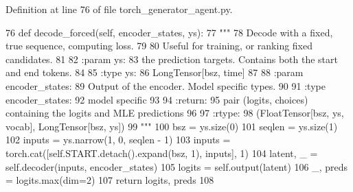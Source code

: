 Definition at line 76 of file torch\+\_\+generator\+\_\+agent.\+py.


\begin{DoxyCode}
76     \textcolor{keyword}{def }decode\_forced(self, encoder\_states, ys):
77         \textcolor{stringliteral}{"""}
78 \textcolor{stringliteral}{        Decode with a fixed, true sequence, computing loss.}
79 \textcolor{stringliteral}{}
80 \textcolor{stringliteral}{        Useful for training, or ranking fixed candidates.}
81 \textcolor{stringliteral}{}
82 \textcolor{stringliteral}{        :param ys:}
83 \textcolor{stringliteral}{            the prediction targets. Contains both the start and end tokens.}
84 \textcolor{stringliteral}{}
85 \textcolor{stringliteral}{        :type ys:}
86 \textcolor{stringliteral}{            LongTensor[bsz, time]}
87 \textcolor{stringliteral}{}
88 \textcolor{stringliteral}{        :param encoder\_states:}
89 \textcolor{stringliteral}{            Output of the encoder. Model specific types.}
90 \textcolor{stringliteral}{}
91 \textcolor{stringliteral}{        :type encoder\_states:}
92 \textcolor{stringliteral}{            model specific}
93 \textcolor{stringliteral}{}
94 \textcolor{stringliteral}{        :return:}
95 \textcolor{stringliteral}{            pair (logits, choices) containing the logits and MLE predictions}
96 \textcolor{stringliteral}{}
97 \textcolor{stringliteral}{        :rtype:}
98 \textcolor{stringliteral}{            (FloatTensor[bsz, ys, vocab], LongTensor[bsz, ys])}
99 \textcolor{stringliteral}{        """}
100         bsz = ys.size(0)
101         seqlen = ys.size(1)
102         inputs = ys.narrow(1, 0, seqlen - 1)
103         inputs = torch.cat([self.START.detach().expand(bsz, 1), inputs], 1)
104         latent, \_ = self.decoder(inputs, encoder\_states)
105         logits = self.output(latent)
106         \_, preds = logits.max(dim=2)
107         \textcolor{keywordflow}{return} logits, preds
108 
\end{DoxyCode}
\mbox{\label{classparlai_1_1core_1_1torch__generator__agent_1_1TorchGeneratorModel_a5f1915200b6a8c6518fe17889d2b7cdc}} 
